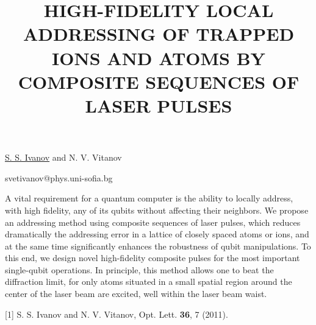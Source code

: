 \title{HIGH-FIDELITY LOCAL ADDRESSING OF TRAPPED IONS AND ATOMS BY COMPOSITE SEQUENCES OF LASER PULSES}

\underline{S. S. Ivanov} and N. V. Vitanov

{\normalsize{
\vspace{-4mm}\unisofia

\email svetivanov@phys.uni-sofia.bg}}

A vital requirement for a quantum computer is the ability to locally address, with high fidelity, any of its qubits without affecting their neighbors. We propose an addressing method using composite sequences of laser pulses, which reduces dramatically the addressing error in a lattice of closely spaced atoms or ions, and at the same time significantly enhances the robustness of qubit manipulations.
To this end, we design novel high-fidelity composite pulses for the most important single-qubit operations.
In principle, this method allows one to beat the diffraction limit, for only atoms situated in a small spatial region around the center of the laser beam are excited, well within the laser beam waist.

{\normalsize
[1] S. S. Ivanov and N. V. Vitanov, Opt. Lett. \textbf{36}, 7 (2011).
}

\vspace{\baselineskip} 